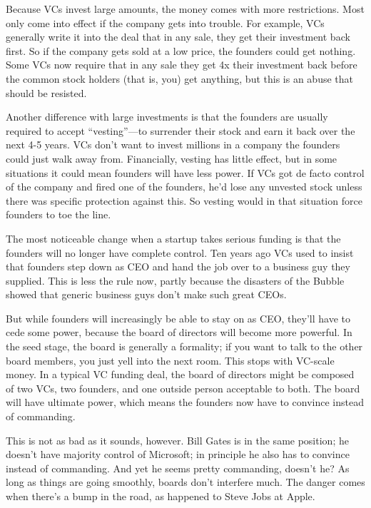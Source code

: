 \documentclass[12pt]{book}
\begin{document}
Because VCs invest large amounts, the money comes with more
restrictions. Most only come into effect if the company gets into
trouble. For example, VCs generally write it into the deal that in any
sale, they get their investment back first. So if the company gets sold
at a low price, the founders could get nothing. Some VCs now require
that in any sale they get 4x their investment back before the common
stock holders (that is, you) get anything, but this is an abuse that
should be resisted.

Another difference with large investments is that the founders are
usually required to accept ``vesting''---to surrender their stock and
earn it back over the next 4-5 years. VCs don't want to invest millions
in a company the founders could just walk away from. Financially,
vesting has little effect, but in some situations it could mean founders
will have less power. If VCs got de facto control of the company and
fired one of the founders, he'd lose any unvested stock unless there was
specific protection against this. So vesting would in that situation
force founders to toe the line.

The most noticeable change when a startup takes serious funding is that
the founders will no longer have complete control. Ten years ago VCs
used to insist that founders step down as CEO and hand the job over to a
business guy they supplied. This is less the rule now, partly because
the disasters of the Bubble showed that generic business guys don't make
such great CEOs.

But while founders will increasingly be able to stay on as CEO, they'll
have to cede some power, because the board of directors will become more
powerful. In the seed stage, the board is generally a formality; if you
want to talk to the other board members, you just yell into the next
room. This stops with VC-scale money. In a typical VC funding deal, the
board of directors might be composed of two VCs, two founders, and one
outside person acceptable to both. The board will have ultimate power,
which means the founders now have to convince instead of commanding.

This is not as bad as it sounds, however. Bill Gates is in the same
position; he doesn't have majority control of Microsoft; in principle he
also has to convince instead of commanding. And yet he seems pretty
commanding, doesn't he? As long as things are going smoothly, boards
don't interfere much. The danger comes when there's a bump in the road,
as happened to Steve Jobs at Apple.
\end{document}
